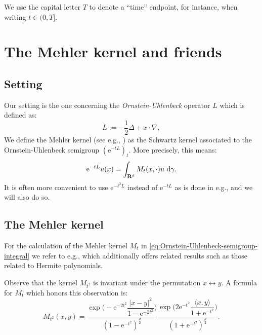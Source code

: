 \documentclass[a4paper,oneside,10pt]{amsproc}
\theoremstyle{plain}
\theoremstyle{remark}
\theoremstyle{definition}
\newcommand{\D}{\,\textup{d}}
\newcommand{\la}{\langle}
\newcommand{\ra}{\rangle}
\newcommand{\R}{\mathbf R}
\newcommand{\e}{\mathrm{e}} %
\begin{document}
We use the capital letter $T$ to denote a ``time'' endpoint, for
instance, when writing $t \in (0, T]$.

%
%
%

\section{The Mehler kernel and friends}
\subsection{Setting}
Our setting is the one concerning the \emph{Ornstein-Uhlenbeck}
operator $L$ which is defined as:
\begin{equation}
  \label{eq:Ornstein-Uhlenbeck-operator}
  L := -\frac12 \Delta + x \cdot \nabla,
\end{equation}
We define the Mehler kernel (see e.g., \textcite{Sjogren1997}) as the
Schwartz kernel associated to the Ornstein-Uhlenbeck semigroup
$(\e^{-tL})_t$. More precisely, this means:
\begin{equation}
  \label{eq:Ornstein-Uhlenbeck-semigroup-integral}
  \e^{-tL} u(x) = \int_{\R^d} M_t(x, \cdot) u \, \D\gamma.
\end{equation}
It is often more convenient to use $\e^{-t^2 L}$ instead of $\e^{-tL}$
as is done in e.g., \textcite{Portal2012} and we will also do so.

\subsection{The Mehler kernel}
For the calculation of the Mehler kernel $M_t$ in
\eqref{eq:Ornstein-Uhlenbeck-semigroup-integral} we refer to e.g.,
\textcite{Sjogren1997} which additionally offers related results such
as those related to Hermite polynomials.

Observe that the kernel $M_{t^2}$ is invariant under the permutation
$x \leftrightarrow y$. A formula for $M_t$ which honors this
observation is:
\begin{equation}
  \label{eq:Mehler-kernel}
  M_{t^2}(x, y) = \frac{\exp\biggl(-\e^{-2t^2} \dfrac{|x - y|^2}{1
      - \e^{-2 t^2}}  \biggr)}{(1 - \e^{-t^2})^{\frac{d}2}}
  \frac{\exp\biggl(2\e^{-t^2} \dfrac{\la x, y \ra}{1 + \e^{-t^2}}
    \biggr)}{(1 + \e^{-t^2})^{\frac{d}2}}.
\end{equation}
\end{document}
